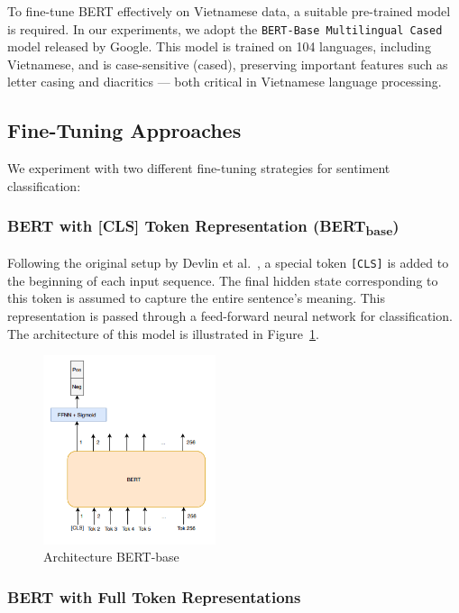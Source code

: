 \documentclass[11pt]{article}
\begin{document}
To fine-tune BERT effectively on Vietnamese data, a suitable pre-trained model is required. In our experiments, we adopt the \texttt{BERT-Base Multilingual Cased} model released by Google. This model is trained on 104 languages, including Vietnamese, and is case-sensitive (cased), preserving important features such as letter casing and diacritics — both critical in Vietnamese language processing.

\subsection{Fine-Tuning Approaches}

We experiment with two different fine-tuning strategies for sentiment classification:

\subsubsection{BERT with [CLS] Token Representation (BERT\textsubscript{base})}

Following the original setup by Devlin et al.~\cite{BERTJacob}, a special token \texttt{[CLS]} is added to the beginning of each input sequence. The final hidden state corresponding to this token is assumed to capture the entire sentence's meaning. This representation is passed through a feed-forward neural network for classification. The architecture of this model is illustrated in Figure~\ref{fig:bert_cls_architecture}.

\begin{figure}[h]
\centering
\includegraphics[width=0.45\textwidth]{img/BertBase.png}
\caption{Architecture BERT-base}
\label{fig:bert_cls_architecture}
\end{figure}
\FloatBarrier

\subsubsection{BERT with Full Token Representations}
\end{document}
